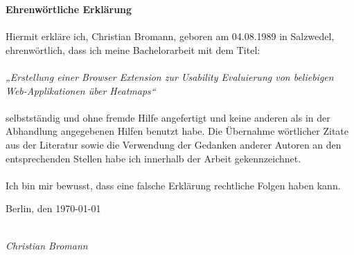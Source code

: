 %
%

\newpage

\thispagestyle{empty}

\begin{large}

\vspace*{1cm}

\noindent
{\Huge \textbf{Ehrenwörtliche Erklärung}}\\
\\
Hiermit erkläre ich, Christian Bromann, geboren am 04.08.1989 in Salzwedel, ehrenwörtlich, dass ich meine Bachelorarbeit mit dem Titel:\\
\\
\textit{„Erstellung einer Browser Extension zur Usability Evaluierung von beliebigen Web-Applikationen über Heatmaps“}\\
\\
selbstständig und ohne fremde Hilfe angefertigt und keine anderen als in der Abhandlung angegebenen Hilfen benutzt habe.
Die Übernahme wörtlicher Zitate aus der Literatur sowie die Verwendung der Gedanken anderer Autoren an den entsprechenden Stellen habe ich innerhalb der Arbeit gekennzeichnet.\\
\\
Ich bin mir bewusst, dass eine falsche Erklärung rechtliche Folgen haben kann.

\vspace{2cm}

\noindent
Berlin, den \today

\vspace{3cm}

\hspace*{7cm}%
\dotfill\\
\hspace*{9.5cm}%
\textit{Christian Bromann}

\end{large}
